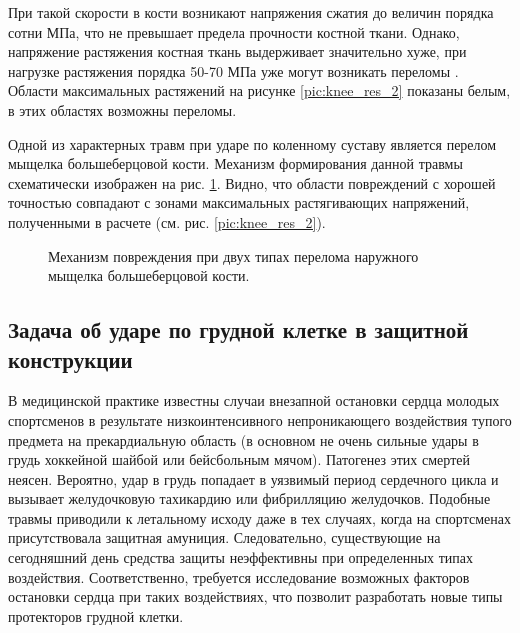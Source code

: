\clearpage
\newpage

При такой скорости в кости возникают напряжения сжатия до величин порядка сотни МПа, что не превышает предела прочности костной ткани. Однако, напряжение растяжения костная ткань выдерживает значительно хуже, при нагрузке растяжения порядка 50-70 МПа уже могут возникать переломы \cite{begun}. Области максимальных растяжений на рисунке \ref{pic:knee_res_2} показаны белым, в этих областях возможны переломы.

Одной из характерных травм при ударе по коленному суставу является перелом мыщелка большеберцовой кости. Механизм формирования данной травмы схематически изображен на рис. \ref{pic:knee_crack_scheme}. Видно, что области повреждений с хорошей точностью совпадают с зонами максимальных растягивающих напряжений, полученными в расчете (см. рис. \ref{pic:knee_res_2}).

\begin{figure}[h]
\caption{Механизм повреждения при двух типах перелома наружного мыщелка большеберцовой кости.}
\label{pic:knee_crack_scheme}
\end{figure}


\clearpage
\newpage


\subsection{Задача об ударе по грудной клетке в защитной конструкции}

В медицинской практике известны случаи внезапной остановки сердца молодых спортсменов в результате низкоинтенсивного непроникающего воздействия тупого предмета на прекардиальную область (в основном не очень сильные удары в грудь хоккейной шайбой или бейсбольным мячом). Патогенез этих смертей неясен. Вероятно, удар в грудь попадает в уязвимый период сердечного цикла и вызывает желудочковую тахикардию или фибрилляцию желудочков. Подобные травмы приводили к летальному исходу даже в тех случаях, когда на спортсменах присутствовала защитная амуниция. Следовательно, существующие на сегодняшний день средства защиты неэффективны при определенных типах воздействия. Соответственно, требуется исследование возможных факторов остановки сердца при таких воздействиях, что позволит разработать новые типы протекторов грудной клетки.

